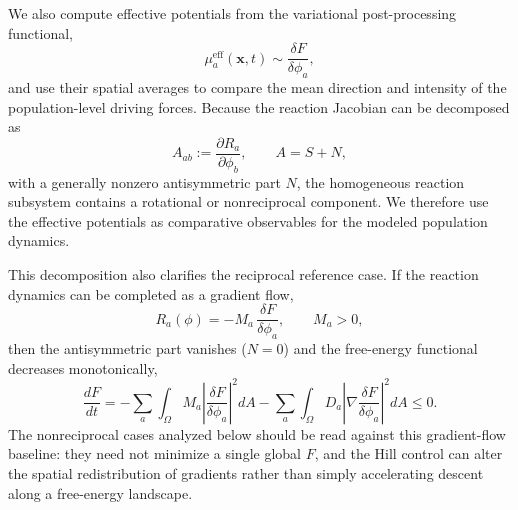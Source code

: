 We also compute effective potentials from the variational post-processing functional,
\begin{equation}
    \mu_a^{\mathrm{eff}}(\mathbf{x},t)
    \sim \frac{\delta F}{\delta\phi_a},
    \label{eq:effective-potentials}
\end{equation}
and use their spatial averages to compare the mean direction and intensity of the population-level driving forces. Because the reaction Jacobian can be decomposed as
\begin{equation}
    A_{ab}:=\frac{\partial R_a}{\partial\phi_b},
    \qquad
    A=S+N,
    \label{eq:jacobian-symmetric-antisymmetric}
\end{equation}
with a generally nonzero antisymmetric part $N$, the homogeneous reaction subsystem contains a rotational or nonreciprocal component. We therefore use the effective potentials as comparative observables for the modeled population dynamics.

This decomposition also clarifies the reciprocal reference case. If the reaction dynamics can be completed as a gradient flow,
\begin{equation}
    R_a(\phi)=-M_a\,\frac{\delta F}{\delta\phi_a},
    \qquad M_a>0,
    \label{eq:reciprocal-gradient-flow}
\end{equation}
then the antisymmetric part vanishes ($N=0$) and the free-energy functional decreases monotonically,
\begin{equation}
    \frac{dF}{dt}
    =-\sum_a\int_\Omega M_a
    \left|\frac{\delta F}{\delta\phi_a}\right|^2 dA
    -\sum_a\int_\Omega D_a
    \left|\nabla\frac{\delta F}{\delta\phi_a}\right|^2 dA
    \leq 0 .
    \label{eq:free-energy-descent}
\end{equation}
The nonreciprocal cases analyzed below should be read against this gradient-flow baseline: they need not minimize a single global $F$, and the Hill control can alter the spatial redistribution of gradients rather than simply accelerating descent along a free-energy landscape.

